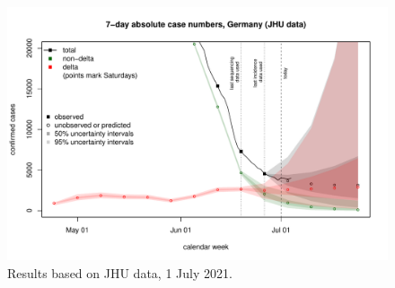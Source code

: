 \documentclass{article}
\begin{document}
\begin{figure}
\center
\includegraphics[scale=0.6]{plots/plot_JHU_2021-07-01.pdf}
\caption{Results based on JHU data, 1 July 2021.}
\end{figure}
\end{document}
